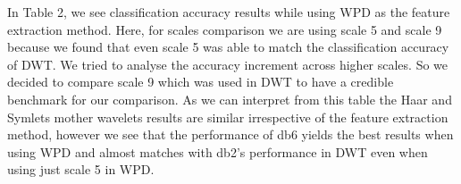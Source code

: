 \documentclass[10pt,twocolumn,letterpaper]{article}
\begin{document}
 In Table 2, we see classification accuracy results while using WPD as the feature extraction method. Here, for scales comparison we are using scale 5 and scale 9 because we found that even scale 5 was able to match the classification accuracy of DWT. We tried to analyse the accuracy increment across higher scales. So we decided to compare scale 9 which was used in DWT to have a credible benchmark for our comparison. As we can interpret from this table the Haar and Symlets mother wavelets results are similar irrespective of the feature extraction method, however we see that the performance of db6 yields the best results when using WPD and almost matches with db2's performance in DWT even when using just scale 5 in WPD.\\


\end{document}
